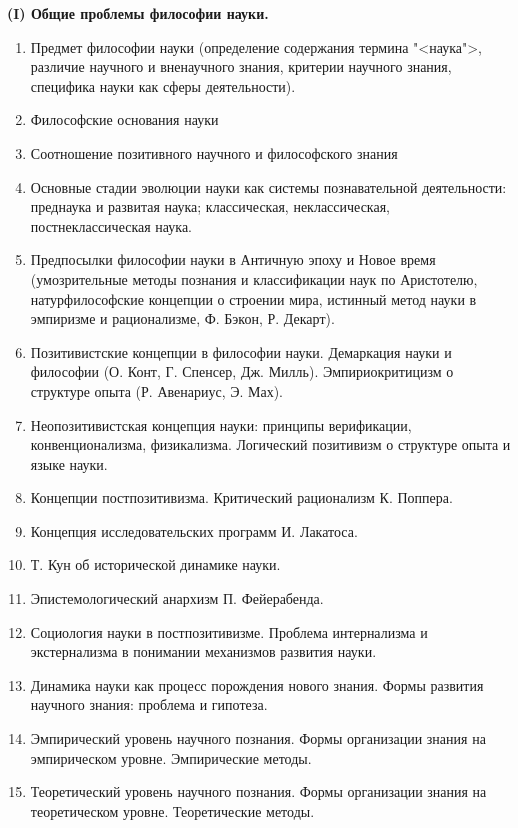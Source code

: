 \documentclass[main.tex]{subfiles}
\begin{document}

\vspace{3mm}
{\parindent0pt\textbf{(I) Общие проблемы философии науки.}}

\begin{enumerate}[leftmargin=*]
	\item Предмет философии науки (определение содержания термина "<наука">, различие научного и вненаучного знания, критерии научного знания, специфика науки как сферы деятельности).
	\item Философские основания науки
	\item Соотношение позитивного научного и философского знания
	\item Основные стадии эволюции науки как системы познавательной деятельности: преднаука и развитая наука; классическая, неклассическая, постнеклассическая наука.
	\item Предпосылки философии науки в Античную эпоху и Новое время (умозрительные методы познания и классификации наук по Аристотелю, натурфилософские концепции о строении мира, истинный метод науки в эмпиризме и рационализме, Ф. Бэкон, Р. Декарт).
	\item Позитивистские концепции в философии науки. Демаркация науки и философии (О. Конт, Г. Спенсер, Дж. Милль). Эмпириокритицизм о структуре опыта (Р. Авенариус, Э. Мах).
	\item Неопозитивистская концепция науки: принципы верификации, конвенционализма, физикализма. Логический позитивизм о структуре опыта и языке науки.
	\item Концепции постпозитивизма. Критический рационализм К. Поппера.
	\item Концепция исследовательских программ И. Лакатоса.
	\item Т. Кун об исторической динамике науки.
	\item Эпистемологический анархизм П. Фейерабенда.
	\item Социология науки в постпозитивизме. Проблема интернализма и экстернализма в понимании механизмов развития науки.
	\item Динамика науки как процесс порождения нового знания. Формы развития научного знания: проблема и гипотеза.
	\item Эмпирический уровень научного познания. Формы организации знания на эмпирическом уровне. Эмпирические методы.
	\item Теоретический уровень научного познания. Формы организации знания на теоретическом уровне. Теоретические методы.

\end{enumerate}
\end{document}
